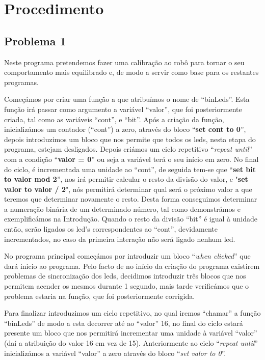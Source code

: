 \documentclass[a4paper, 12pt, onecolumn, oneside]{report}
\begin{document}
 



 \newpage
 
\section{Procedimento}

\subsection{Problema 1}

Neste programa pretendemos fazer uma calibração ao robô para tornar o seu comportamento mais equilibrado e, de modo a servir como base para os restantes programas.

Começámos por criar uma função a que atribuímos o nome de “binLeds”. Esta função irá passar como argumento a variável “valor”, que foi posteriormente criada, tal como as variáveis “cont”, e “bit”. Após a criação da função, inicializámos um contador (“cont”) a zero, através do bloco “\textbf{set cont to 0}”, depois introduzimos um bloco que nos permite que todos os leds, nesta etapa do programa, estejam desligados.  Depois criámos um ciclo repetitivo “\emph{repeat until}” com a condição “\textbf{valor = 0}” ou seja a variável terá o seu início em zero. No final do ciclo, é incrementada uma unidade ao “cont”, de seguida tem-se que “\textbf{set bit to valor mod 2}”, nos irá permitir calcular o resto da divisão do valor, e "\textbf{set valor to valor / 2}", nós permitirá determinar qual será o próximo valor a que teremos que determinar novamente o resto. Desta forma conseguimos determinar a numeração binária de um determinado número, tal como demonstrámos e exemplificámos na Introdução. Quando o resto da divisão “bit” é igual à unidade então, serão ligados os led’s correspondentes ao “cont”, devidamente incrementados, no caso da primeira interação não será ligado nenhum led.

No programa principal começámos por introduzir um bloco “\emph{when clicked}” que dará inicio ao programa. Pelo facto de no início da criação do programa existirem problemas de sincronização dos leds, decidimos introduzir três blocos que nos permitem acender os mesmos durante 1 segundo, mais tarde verificámos que o problema estaria na função, que foi posteriormente corrigida.

Para finalizar introduzimos um ciclo repetitivo, no qual iremos “chamar” a função “binLeds” de modo a esta decorrer até ao “valor” 16, no final do ciclo estará presente um bloco que nos permitirá incrementar uma unidade à variável “valor” (daí a atribuição do valor 16 em vez de 15). Anteriormente ao ciclo “\emph{repeat until}” inicializámos a variável “valor” a zero através do bloco “\emph{set valor to 0}”. 
\end{document}

